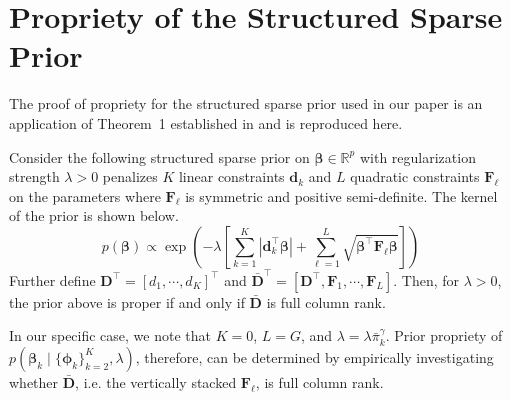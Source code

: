 \section{Propriety of the Structured Sparse Prior}
\label{sec:app_ssparse_prior}

The proof of propriety for the structured sparse prior used in our
paper is an application of Theorem~1 established in
\cite{goplerud2021sparsity} and is reproduced here.
\begin{theorem} 
	\label{result:goplerud_1}
        Consider the following structured sparse prior on
        $\bm{\beta} \in \mathbb{R}^p$ with regularization strength
        $\lambda > 0$ penalizes $K$ linear constraints $\bm{d}_k$ and
        $L$ quadratic constraints $\bm{F}_\ell$ on the parameters
        where $\bm{F}_\ell$ is symmetric and positive
        semi-definite. The kernel of the prior is shown below.
  $$p(\bm{\beta}) \propto \exp\left(-\lambda \left[\sum_{k=1}^K
      |\bm{d}_k^\top \bm{\beta}| + \sum_{\ell=1}^L \sqrt{
        \bm{\beta}^\top \bm{F}_{\ell} \bm{\beta}}\right] \right)$$ Further
  define $\bm{D}^\top = [d_1, \cdots, d_K]^\top$ and
  $\bar{\bm{D}}^\top = [\bm{D}^\top, \bm{F}_1, \cdots, \bm{F}_L]$.
  Then, for $\lambda >0 $, the prior above is proper if and only if
  $\bar{\bm{D}}$ is full column rank.
\end{theorem}
In our specific case, we note that $K = 0$, $L = G$, and
$\lambda = \lambda \bar{\pi}_k^\gamma$. Prior propriety of
$p(\bm{\beta}_k \mid \{\bm{\phi}_k\}_{k=2}^K, \lambda)$, therefore,
can be determined by empirically investigating whether $\bar{\bm{D}}$,
i.e. the vertically stacked $\bm{F}_\ell$, is full column rank.

